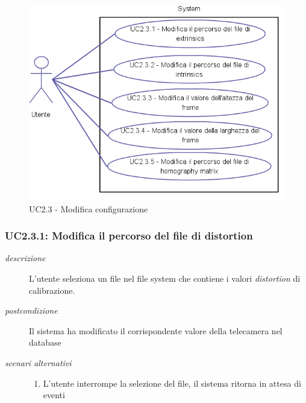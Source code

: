 \begin{figure}[htpb] 

\centering 

\includegraphics[scale=0.4]{./images/uc23.png} 

\caption{UC2.3 - Modifica configurazione} 

\label{fig:uc2.3}

\end{figure} 

\subsubsection{UC2.3.1: Modifica il percorso del file di distortion} \label{sec:UC2.3.1}
\begin{description}
\item[\em{descrizione }]L'utente seleziona un file nel file system che contiene i valori \textit{distortion} di calibrazione.
\item[\em{postcondizione }] Il sistema ha modificato il corrispondente valore della telecamera nel database
\item[\em{scenari alternativi }] \mbox{}

  \begin{enumerate}
\item L'utente interrompe la selezione del file, il sistema ritorna in attesa di eventi
\end{enumerate}
\end{description}

